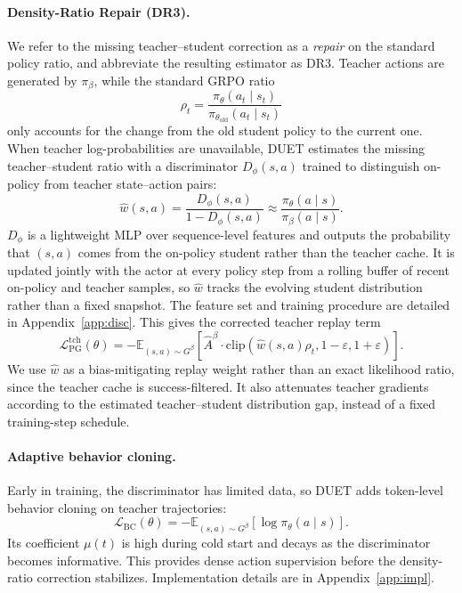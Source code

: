 \paragraph{Density-Ratio Repair (DR3).}
We refer to the missing teacher--student correction as a \emph{repair} on the standard policy ratio, and abbreviate the resulting estimator as DR3.
Teacher actions are generated by $\pi_\beta$, while the standard GRPO ratio
\begin{equation}
\rho_t
=
\frac{\pi_\theta(a_t\mid s_t)}
{\pi_{\theta_{\mathrm{old}}}(a_t\mid s_t)}
\label{eq:grpo_ratio}
\end{equation}
only accounts for the change from the old student policy to the current one.
When teacher log-probabilities are unavailable, DUET estimates the missing teacher--student ratio with a discriminator $D_\phi(s,a)$ trained to distinguish on-policy from teacher state--action pairs:
\begin{equation}
\hat w(s,a)
=
\frac{D_\phi(s,a)}{1-D_\phi(s,a)}
\approx
\frac{\pi_\theta(a\mid s)}
{\pi_\beta(a\mid s)} .
\label{eq:dr3_ratio}
\end{equation}
$D_\phi$ is a lightweight MLP over sequence-level features and outputs the probability that $(s,a)$ comes from the on-policy student rather than the teacher cache.
It is updated jointly with the actor at every policy step from a rolling buffer of recent on-policy and teacher samples, so $\hat w$ tracks the evolving student distribution rather than a fixed snapshot.
The feature set and training procedure are detailed in Appendix~\ref{app:disc}.
This gives the corrected teacher replay term
\begin{equation}
\mathcal{L}_{\mathrm{PG}}^{\mathrm{tch}}(\theta)
=
-\mathbb{E}_{(s,a)\sim G^\beta}
\left[
\hat A^\beta
\cdot
\mathrm{clip}
\left(
\hat w(s,a)\rho_t,
1-\varepsilon,
1+\varepsilon
\right)
\right].
\label{eq:dr3_loss}
\end{equation}
We use $\hat w$ as a bias-mitigating replay weight rather than an exact likelihood ratio, since the teacher cache is success-filtered.
It also attenuates teacher gradients according to the estimated teacher--student distribution gap, instead of a fixed training-step schedule.

\paragraph{Adaptive behavior cloning.}
Early in training, the discriminator has limited data, so DUET adds token-level behavior cloning on teacher trajectories:
\begin{equation}
\mathcal{L}_{\mathrm{BC}}(\theta)
=
-\mathbb{E}_{(s,a)\sim G^\beta}
\left[
\log \pi_\theta(a\mid s)
\right].
\label{eq:bc_loss}
\end{equation}
Its coefficient $\mu(t)$ is high during cold start and decays as the discriminator becomes informative.
This provides dense action supervision before the density-ratio correction stabilizes.
Implementation details are in Appendix~\ref{app:impl}.

